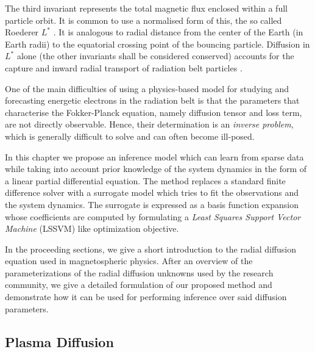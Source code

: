 The third invariant represents the total magnetic flux enclosed within a full particle orbit. It is 
common to use a normalised form of this, the so called Roederer $L^{*}$ \citep{Roederer1970}. It is 
analogous to radial distance from the center of the Earth (in Earth radii) to the equatorial 
crossing point of the bouncing particle. Diffusion in $L^{*}$ alone (the other invariants shall be 
considered conserved) accounts for the capture and inward radial transport of radiation belt 
particles \citep{Roederer1970,JGR:JGR4463}.

One of the main difficulties of using a physics-based model for studying and forecasting energetic 
electrons in the radiation belt is that the parameters that characterise the Fokker-Planck 
equation, namely diffusion tensor and loss term, are not directly observable. Hence, their 
determination is an \emph{inverse problem}, which is generally difficult to solve and can often 
become ill-posed.

In this chapter we propose an inference model which can learn from sparse data while taking into 
account prior knowledge of the system dynamics in the form of a linear partial differential 
equation. The method replaces a standard finite difference solver with a surrogate model which 
tries to fit the observations and the system dynamics. The surrogate is expressed as a basis 
function expansion whose coefficients are computed by formulating a 
\emph{Least Squares Support Vector Machine} (LSSVM) like optimization objective.

In the proceeding sections, we give a short introduction to the radial diffusion equation used in 
magnetospheric physics. After an overview of the parameterizations of the radial diffusion unknowns 
used by the research community, we give a detailed formulation of our proposed method and 
demonstrate how it can be used for performing inference over said diffusion parameters.

\subsection{Plasma Diffusion}

